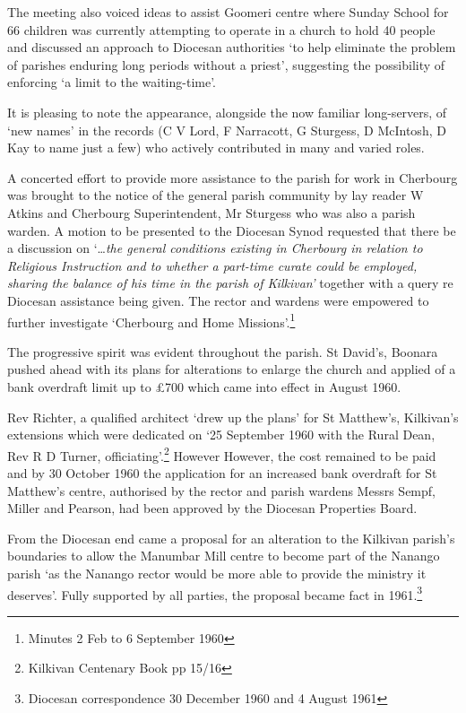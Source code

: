 The meeting also voiced ideas to assist Goomeri centre where Sunday School for 66 children was currently attempting to operate in a church to hold 40 people and discussed an approach to Diocesan authorities `to help eliminate the problem of parishes enduring long periods without a priest', suggesting the possibility of enforcing `a limit to the waiting-time'.



It is pleasing to note the appearance, alongside the now familiar long-servers, of `new names' in the records (C V Lord, F Narracott, G Sturgess, D McIntosh, D Kay to name just a few) who actively contributed in many and varied roles.



A concerted effort to provide more assistance to the parish for work in Cherbourg was brought to the notice of the general parish community by lay reader W Atkins and Cherbourg Superintendent, Mr Sturgess who was also a parish warden. A motion to be presented to the Diocesan Synod requested that there be a discussion on `\ldots{}\emph{the general conditions existing in Cherbourg in relation to Religious Instruction and to whether a part-time curate could be employed, sharing the balance of his time in the parish of Kilkivan'} together with a query re Diocesan assistance being given. The rector and wardens were empowered to further investigate `Cherbourg and Home Missions'.\footnote{Minutes 2 Feb to 6 September 1960}


The progressive spirit was evident throughout the parish. St David's, Boonara pushed ahead with its plans for alterations to enlarge the church and applied of a bank overdraft limit up to \pounds700 which came into effect in August 1960.



Rev Richter, a qualified architect `drew up the plans' for St Matthew's, Kilkivan's extensions which were dedicated on `25 September 1960 with the Rural Dean, Rev R D Turner, officiating'.\footnote{Kilkivan Centenary Book pp 15/16} However However, the cost remained to be paid and by 30 October 1960 the application for an increased bank overdraft for St Matthew's centre, authorised by the rector and parish wardens Messrs Sempf, Miller and Pearson, had been approved by the Diocesan Properties Board.


From the Diocesan end came a proposal for an alteration to the Kilkivan parish's boundaries to allow the Manumbar Mill centre to become part of the Nanango parish `as the Nanango rector would be more able to provide the ministry it deserves'. Fully supported by all parties, the proposal became fact in 1961.\footnote{Diocesan correspondence 30 December 1960 and 4 August 1961}


